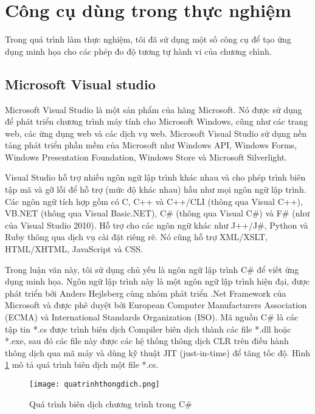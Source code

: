 \section{Công cụ dùng trong thực nghiệm}

Trong quá trình làm thực nghiệm, tôi đã sử dụng một số công cụ để tạo ứng 
dụng minh họa cho các phép đo độ tương tự hành vi của chương chình.

\subsection{Microsoft Visual studio}
Microsoft Visual Studio là một sản phẩm của hãng Microsoft. Nó được sử dụng 
để phát triển chương trình máy tính cho Microsoft Windows, cũng như các 
trang web, các ứng dụng web và các dịch vụ web. Microsoft Visual Studio 
sử dụng nền tảng phát triển phần mềm của Microsoft như Windows API, Windows 
Forms, Windows Presentation Foundation, Windows Store và Microsoft Silverlight. 

Visual Studio hỗ trợ nhiều ngôn ngữ lập trình khác nhau và cho phép trình biên 
tập mã và gỡ lỗi để hỗ trợ (mức độ khác nhau) hầu như mọi ngôn ngữ lập trình. 
Các ngôn ngữ tích hợp gồm có C, C++ và C++/CLI (thông qua Visual C++), VB.NET 
(thông qua Visual Basic.NET), C\#  (thông qua Visual C\#) và F\# 
(như của Visual Studio 2010). Hỗ trợ cho các ngôn ngữ khác như J++/J\#, Python 
và Ruby thông qua dịch vụ cài đặt riêng rẽ. Nó cũng hỗ trợ XML/XSLT, 
HTML/XHTML, JavaScript và CSS.

Trong luận văn này, tôi sử dụng chủ yếu là ngôn ngữ lập trình C\# để viết ứng 
dụng minh họa. Ngôn ngữ lập trình này là một ngôn ngữ lập trình hiện đại, được 
phát triển bởi Anders Hejlsberg cùng nhóm phát triển .Net Framework của Microsoft 
và được phê duyệt bởi European Computer Manufacturers Association (ECMA) và 
International Standards Organization (ISO). Mã nguồn C\# là các tập tin *.cs 
được trình biên dịch Compiler biên dịch thành các file *.dll hoặc *.exe, sau 
đó các file này được các hệ thống thông dịch CLR trên điều hành thông dịch qua 
mã máy và dùng kỹ thuật JIT (just-in-time) để tăng tốc độ. Hình \ref{fig:ProcessCompile} 
mô tả quá trình biên dịch một file *.cs.


\begin{figure}[H]	
	\begin{center}
	  \texttt{[image: quatrinhthongdich.png]}
	\end{center}
	\caption{Quá trình biên dịch chương trình trong C\#}
	\label{fig:ProcessCompile}
\end{figure}


